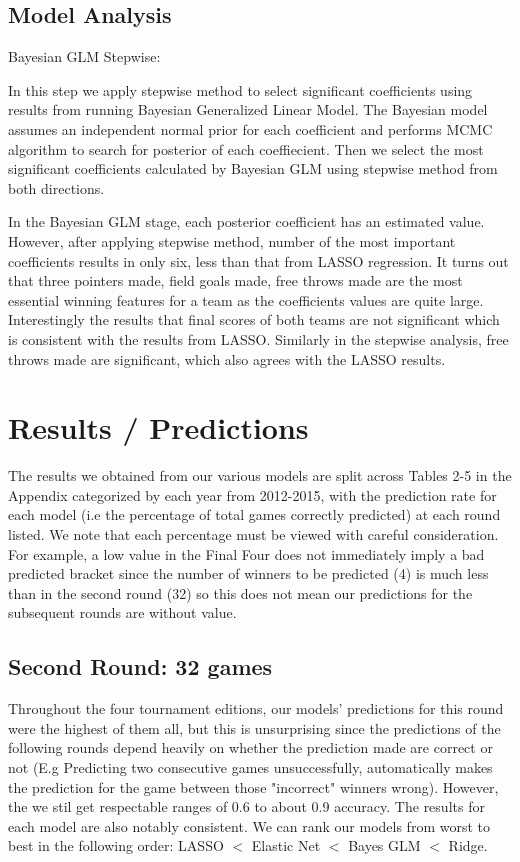 \documentclass{article} %
\begin{document}
\subsection{Model Analysis}

Bayesian GLM Stepwise:

In this step we apply stepwise method to select significant coefficients using results from running Bayesian Generalized Linear Model. The Bayesian model assumes an independent normal prior for each coefficient and performs MCMC algorithm to search for posterior of each coeffiecient. Then we select the most significant coefficients calculated by Bayesian GLM using stepwise method from both directions.

In the Bayesian GLM stage, each posterior coefficient has an estimated value. However, after applying stepwise method, number of the most important coefficients results in only six, less than that from LASSO regression. It turns out that three pointers made, field goals made, free throws made are the most essential winning features for a team as the coefficients values are quite large. Interestingly the results that final scores of both teams are not significant which is consistent with the results from LASSO. Similarly in the stepwise analysis, free throws made are significant, which also agrees with the LASSO results.

\section{Results / Predictions}

The results we obtained from our various models are split across Tables 2-5 in the Appendix categorized by each year from 2012-2015, with the prediction rate for each model (i.e the percentage of total games correctly predicted) at each round listed. We note that each percentage must be viewed with careful consideration. For example, a low value in the Final Four does not immediately imply a bad predicted bracket since the number of winners to be predicted (4) is much less than in the second round (32) so this does not mean our predictions for the subsequent rounds are without value.

\subsection{Second Round: 32 games}

Throughout the four tournament editions, our models' predictions for this round were the highest of them all, but this is unsurprising since the predictions of the following rounds depend heavily on whether the prediction made are correct or not (E.g Predicting two consecutive games unsuccessfully, automatically makes the prediction for the game between those "incorrect" winners wrong). However, the we stil get respectable ranges of 0.6 to about 0.9 accuracy. The results for each model are also notably consistent. We can rank our models from worst to best in the following order: LASSO $<$ Elastic Net $<$ Bayes GLM $<$ Ridge.
\end{document}
